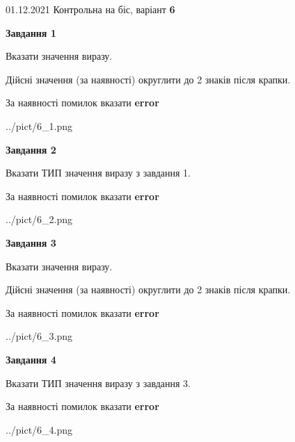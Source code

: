 \documentclass[11pt, ukrainian]{article}
\begin{document}
{01.12.2021 Контрольна на біс, варіант  \No \textbf { 6 }\par}
{
\begin {large}
{\begin {center}\textbf{Завдання 1}\end {center}}\par
Вказати значення виразу. \par
Дійсні значення (за наявності) округлити до 2 знаків після крапки. \par
За наявності помилок вказати \textbf{error}

\begin{center}
	{../pict/6_1.png}
\end{center}
\newpage

{\begin {center}\textbf{Завдання 2}\end {center}}\par
Вказати ТИП значення виразу з завдання 1. \par
За наявності помилок вказати \textbf{error}

\begin{center}
	{../pict/6_2.png}
\end{center}
\newpage

{\begin {center}\textbf{Завдання 3}\end {center}}\par
Вказати значення виразу. \par
Дійсні значення (за наявності) округлити до 2 знаків після крапки. \par
За наявності помилок вказати \textbf{error}

\begin{center}
	{../pict/6_3.png}
\end{center}
\newpage

{\begin {center}\textbf{Завдання 4}\end {center}}\par
Вказати ТИП значення виразу з завдання 3. \par
За наявності помилок вказати \textbf{error}

\begin{center}
	{../pict/6_4.png}
\end{center}
\newpage


\end{large}}
\end{document}
